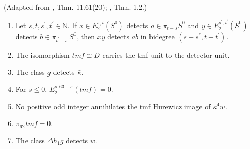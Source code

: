 \begin{theorem}
\label{frontier:Literature:860e3947f28a}
(Adapted from \cite{BR21}, Thm. 11.61(20); \cite{tmf}, Thm. 1.2.)\par{}

\begin{enumerate}
\item Let $s,t,s^{\prime},t^{\prime}\in\mathbb N$. If $x\in E_2^{s,t}(S^0)$ detects $a\in\pi_{t-s}S^0$ and $y\in E_2^{s^{\prime},t^{\prime}}(S^0)$ detects $b\in\pi_{t^{\prime}-s^{\prime}}S^0$, then $xy$ detects $ab$ in bidegree $(s+s^{\prime},t+t^{\prime})$.
\item The isomorphism $\mathit{tmf}\cong D$ carries the tmf unit to the detector unit.
\item The class $g$ detects $\bar\kappa$.
\item For $s\le0$, $E_2^{s,63+s}(\mathit{tmf})=0$.
\item No positive odd integer annihilates the tmf Hurewicz image of $\bar\kappa^4w$.
\item $\pi_{62}\mathit{tmf}=0$.
\item The class $\Delta h_1g$ detects $w$.
\end{enumerate}

\end{theorem}
